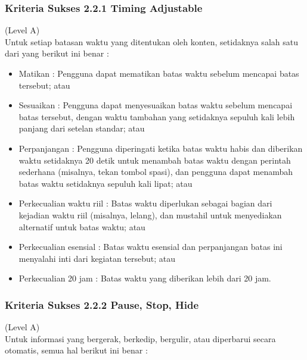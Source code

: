 \documentclass[a4paper,twoside]{article}
\begin{document}
\begin{enumerate}
		\subsubsection*{Kriteria Sukses 2.2.1 Timing Adjustable}
		\label{subsubsec:kriteria_2.2.1}
		(Level A) \\
		
		Untuk setiap batasan waktu yang ditentukan oleh konten, setidaknya salah satu dari yang berikut ini benar :
		
		\begin{itemize}
			\item Matikan : Pengguna dapat mematikan batas waktu sebelum mencapai batas tersebut; atau
			\item Sesuaikan : Pengguna dapat menyesuaikan batas waktu sebelum mencapai batas tersebut, dengan waktu tambahan yang setidaknya sepuluh kali lebih panjang dari setelan standar; atau
			\item Perpanjangan : Pengguna diperingati ketika batas waktu habis dan diberikan waktu setidaknya 20 detik untuk menambah batas waktu dengan perintah sederhana (misalnya, tekan tombol spasi), dan pengguna dapat menambah batas waktu setidaknya sepuluh kali lipat; atau
			\item Perkecualian waktu riil : Batas waktu diperlukan sebagai bagian dari kejadian waktu riil (misalnya, lelang), dan mustahil untuk menyediakan alternatif untuk batas waktu; atau
			\item Perkecualian esensial : Batas waktu esensial dan perpanjangan batas ini menyalahi inti dari kegiatan tersebut; atau
			\item Perkecualian 20 jam : Batas waktu yang diberikan lebih dari 20 jam.
		\end{itemize}
		
		\subsubsection*{Kriteria Sukses 2.2.2 Pause, Stop, Hide}
		\label{subsubsec:kriteria_2.2.2}
		(Level A) \\
		
		Untuk informasi yang bergerak, berkedip, bergulir, atau diperbarui secara otomatis, semua hal berikut ini benar :
		

\end{enumerate}
\end{document}
